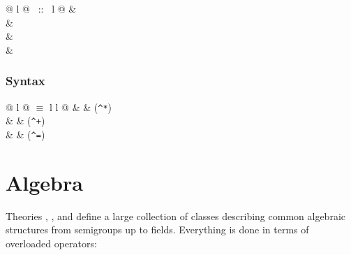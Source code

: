 \begin{isabellebody}
\begin{isamarkuptext}
\begin{tabular}{@ {} l @ {~::~} l @ {}}
 & \\
 & \\
 & \\
 & \\
\end{tabular}

\subsubsection*{Syntax}

\begin{tabular}{@ {} l @ {\quad$\equiv$\quad} l l @ {}}
 &  & (\verb$^*$)\\
 &  & (\verb$^+$)\\
 &  & (\verb$^=$)
\end{tabular}


\section{Algebra}

Theories , ,  and  define a large collection of classes describing common algebraic
structures from semigroups up to fields. Everything is done in terms of
overloaded operators:


\end{isamarkuptext}
\end{isabellebody}
